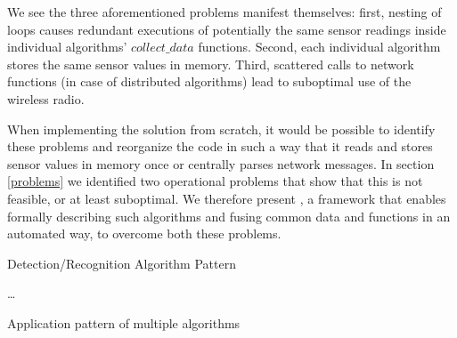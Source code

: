 \documentclass[3p,times,procedia]{elsarticle}
\begin{document}
We see the three aforementioned problems manifest themselves: first, nesting of
loops causes redundant executions of potentially the same sensor readings
inside individual algorithms' $collect\_data$ functions. Second, each
individual algorithm stores the same sensor values in memory. Third, scattered
calls to network functions (in case of distributed algorithms) lead to
suboptimal use of the wireless radio.

When implementing the solution from scratch, it would be possible to identify
these problems and reorganize the code in such a way that it reads and stores
sensor values in memory once or centrally parses network messages. In section
\ref{problems} we identified two operational problems that show that this is
not feasible, or at least suboptimal. We therefore present \FOO, a framework
that enables formally describing such algorithms and fusing common data and
functions in an automated way, to overcome both these problems.

\begin{algorithm}[t]
  \small
  \caption{Detection/Recognition Algorithm Pattern}
  \label{alg:pattern}
  \begin{algorithmic}
     
           
          
      \EndFor
      \State {}  \label{alg:id-algo-pattern-send1}
    \EndFunction
       \label{alg:id-algo-pattern-loop2} \label{alg:id-algo-pattern-common-data}
         
          \State \dots {}
          \State {}  \label{alg:id-algo-pattern-send2}
        \EndIf
      \EndFor
    \EndFunction
  \end{algorithmic}
\end{algorithm}

\begin{algorithm}[t]
  \small
  \caption{Application pattern of multiple algorithms}
  \label{alg:application}
  \begin{algorithmic}
      \State {}
    \EndFor
            
      \State {}
    \EndFor
  \end{algorithmic}
\end{algorithm}
\end{document}

